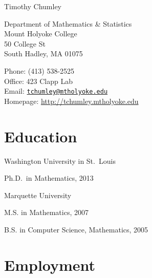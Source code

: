 \documentclass[10pt,letterpaper]{article}
\def\name{Timothy Chumley}
\renewenvironment{itemize}{
  \begin{list}{}{
    \setlength{\leftmargin}{1.5em}
    \setlength{\itemsep}{0.25em}
    \setlength{\parskip}{0pt}
    \setlength{\parsep}{0.25em}
  }
}{
  \end{list}
}
\providecommand{\tightlist}{%
  \setlength{\itemsep}{0pt}\setlength{\parskip}{0pt}}
\let\tightlist\relax
\begin{document}
{\huge \name}


\bigskip

\begin{minipage}[t]{0.495\textwidth}
  Department of Mathematics \& Statistics \\
  Mount Holyoke College \\
  50 College St \\
  South Hadley, MA 01075
\end{minipage}
\begin{minipage}[t]{0.495\textwidth}
  Phone: (413) 538-2525 \\
  Office: 423 Clapp Lab \\
  Email: \href{mailto:tchumley@mtholyoke.edu}{\tt tchumley@mtholyoke.edu} \\
  Homepage: \url{http://tchumley.mtholyoke.edu}
\end{minipage}

\hypertarget{education}{%
\section*{Education}\label{education}}

\begin{itemize}
\tightlist
\item
  Washington University in St.~Louis

  \begin{itemize}
  \tightlist
  \item
    Ph.D.~in Mathematics, 2013
  \end{itemize}
\item
  Marquette University

  \begin{itemize}
  \tightlist
  \item
    M.S. in Mathematics, 2007
  \item
    B.S. in Computer Science, Mathematics, 2005
  \end{itemize}
\end{itemize}

\hypertarget{employment}{%
\section*{Employment}\label{employment}}
\end{document}
